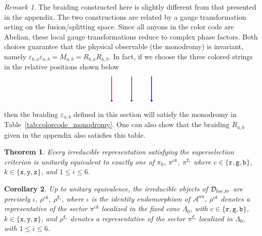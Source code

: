 \documentclass[10pt,a4paper]{amsart}
\newtheorem{theorem}{Theorem}[section]
\newtheorem{corollary}[theorem]{Corollary}
\theoremstyle{definition}
\theoremstyle{remark}
\newtheorem{remark}{Remark}[section]
\theoremstyle{remark}
\begin{document}
\setcounter{section}{3}
\setcounter{equation}{3}
\setcounter{example}{0}
\setcounter{notation}{0}
\setcounter{remark}{3}
\setcounter{theorem}{14}
\begin{remark}\label{rem:gauge_braiding}
The braiding constructed here is slightly different from that presented in the appendix. 
The two constructions are related by a gauge transformation acting on the fusion/splitting space. 
Since all anyons in the color code are Abelian, these local gauge transformations reduce to complex phase factors. 
Both choices guarantee that the physical observable (the monodromy) is invariant, namely
$\varepsilon_{b,a}\varepsilon_{a,b} = M_{a,b} = R_{b,a} R_{a,b}$. 
In fact, if we choose the three colored strings in the relative positions shown below
\begin{equation*}
    \begin{tikzpicture}
        \draw[red, line width=1pt] (0,0) -- (0,1.2);  
        \path[fill = red] (0,0) circle (1.3pt);
        \draw[green!50!black, line width=1pt] (1,0) -- (1,1.2);  
        \path[fill = green!50!black] (1,0) circle (1.3pt);
        \draw[blue, line width=1pt] (2,0) -- (2,1.2);  
        \path[fill = blue] (2,0) circle (1.3pt);
    \end{tikzpicture}
\end{equation*}
then the braiding $\varepsilon_{a,b}$ defined in this section will satisfy the monodromy in Table~\ref{tab:colorcode_monodromy}. 
One can also show that the braiding $R_{a,b}$ given in the appendix also satisfies this table. 
\end{remark}

\setcounter{section}{3}
\setcounter{equation}{7}
\setcounter{example}{0}
\setcounter{notation}{0}
\setcounter{remark}{5}
\setcounter{theorem}{18}
\begin{theorem}\label{thm:complete_sectors}
    Every irreducible representation satisfying the superselection
    criterion is unitarily equivalent to exactly one of $\pi_0$, $\pi^{ck}$, $\pi^{\mathtt f_i}$ where $c\in\{\mathtt r,\mathtt g,\mathtt b\}$, $k\in\{\mathtt x,\mathtt y,\mathtt z\}$, and $1\leq i\leq6$. 
\end{theorem}

\setcounter{section}{3}
\setcounter{equation}{7}
\setcounter{example}{0}
\setcounter{notation}{0}
\setcounter{remark}{5}
\setcounter{theorem}{19}
\begin{corollary}\label{coro:irreducible_objects_complete}
    Up to unitary equivalence, the irreducible objects of
    $\mathcal D_{\rm loc,tr}$ are precisely $\iota$, $\rho^{ck}$, $\rho^{\mathtt f_i}$, where $\iota$ is the identity endomorphism of $\mathcal A^{au}$, $\rho^{ck}$ denotes a representative of the sector $\pi^{ck}$ localized in the fixed cone $\Lambda_0$, with $c\in\{\mathtt r,\mathtt g,\mathtt b\}$, $k\in\{\mathtt x,\mathtt y,\mathtt z\}$, and $\rho^{\mathtt f_i}$ denotes a representative of the sector
    $\pi^{\mathtt f_i}$ localized in $\Lambda_0$, with
    $1\leq i\leq 6$.
\end{corollary}
\end{document}
